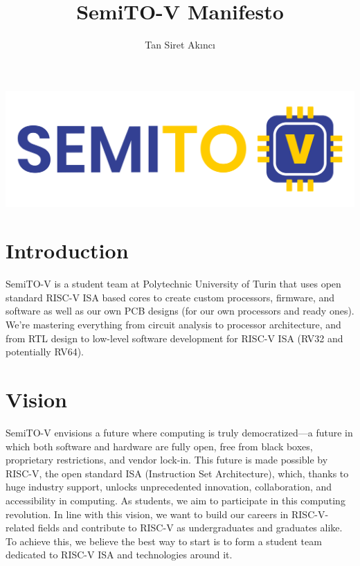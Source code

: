 \documentclass{article}
\title{SemiTO-V Manifesto}
\author{Tan Siret Akıncı}
\date
\begin{document}
\maketitle
\begin{center}
    \includegraphics[scale=0.7]{semito-v_logo.png}
\end{center}
\maketitle

\section{Introduction}

SemiTO-V is a student team at Polytechnic University of Turin that uses open standard RISC-V ISA based cores to create custom processors, firmware, and software as well as our own PCB designs (for our own processors and ready ones). We’re mastering everything from circuit analysis to processor architecture, and from RTL design to low-level software development for RISC-V ISA (RV32 and potentially RV64). 

\section{Vision}

SemiTO-V envisions a future where computing is truly democratized—a future in which both software and hardware are fully open, free from black boxes, proprietary restrictions, and vendor lock-in. This future is made possible by RISC-V, the open standard ISA (Instruction Set Architecture), which, thanks to huge industry support, unlocks unprecedented innovation, collaboration, and accessibility in computing. As students, we aim to participate in this computing revolution. In line with this vision, we want to build our careers in RISC-V-related fields and contribute to RISC-V as undergraduates and graduates alike. To achieve this, we believe the best way to start is to form a student team dedicated to RISC-V ISA and technologies around it.
\end{document}

